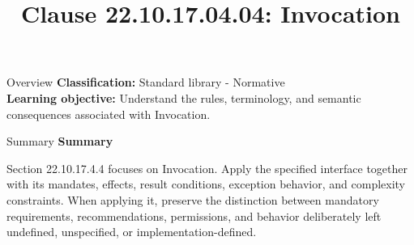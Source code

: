 \documentclass[10pt,letterpaper]{article}
\title{Clause 22.10.17.04.04: Invocation}
\author{}
\date{}
\begin{document}
\maketitle
\begin{CornellOverviewBox}{Overview}
\textbf{Classification:} Standard library - Normative\\[2pt]
\textbf{Learning objective:} Understand the rules, terminology, and semantic consequences associated with Invocation.
\end{CornellOverviewBox}\begin{CornellSummaryBox}{Summary}
{\sffamily\bfseries\color{Accent} Summary}\par\vspace{3pt}Section 22.10.17.4.4 focuses on Invocation. Apply the specified interface together with its mandates, effects, result conditions, exception behavior, and complexity constraints. When applying it, preserve the distinction between mandatory requirements, recommendations, permissions, and behavior deliberately left undefined, unspecified, or implementation-defined.
\end{CornellSummaryBox}
\end{document}
